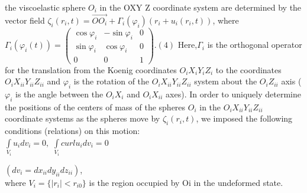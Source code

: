 \documentclass[fontsize = 11pt,a4paper]{article}
\begin{document}
\begin{multicols}{2}
the viscoelastic sphere ${O_i}$ in the OXY Z coordinate
system are determined by the vector field
${\zeta_i}({r_i},t) = \vec{O{O_i}} + {\Gamma_i}({\varphi_i})({r_i}+{u_i}({r_i},t))$,
where
$ {\Gamma_i}({\varphi_i}(t)) =
 \begin{pmatrix} 
\cos{\varphi_i} & -\sin{\varphi_i}  & 0\\
\sin{\varphi_i} & \cos {\varphi_i} & 0\\
0 & 0 & 1
\end{pmatrix}
.(4)$
Here,${\Gamma_i}$ is the orthogonal operator for the translation
from the Koenig coordinates ${O_i}{X_i}{Y_i}{Z_i}$ to the
coordinates ${O_i}{X_{ii}}{Y_{ii}}{Z_{ii}}$ and ${\varphi_i}$ is the rotation of the
${O_i}{X_{ii}}{Y_{ii}}{Z_{ii}}$ system about the ${O_i}{Z_{ii}}$ axis (${\varphi_i}$ is the
angle between the ${O_i}{X_i}$ and ${O_i}{X_{ii}}$ axes).
In order to uniquely determine the positions of the
centers of mass of the spheres ${O_i}$ in the ${O_i}{X_{ii}}{Y_{ii}}{Z_{ii}}$
coordinate systems as the spheres move by ${\zeta_i}({r_i}, t)$,
we imposed the following conditions (relations) on
this motion:\\
\indent
$\int\limits_{V_i} {u_i}d{v_i} = 0,$
$\int\limits_{V_i} curl{u_i}d{v_i} = 0$

$(d{v_i} = d{x_{ii}}d{y_{ii}}d{z_{ii}})$,
\\ where ${V_i} = \{|{r_i}| < {r_{i0}} \}$ is the region occupied by Oi
in the undeformed state.
\end{multicols}
\end{document}
